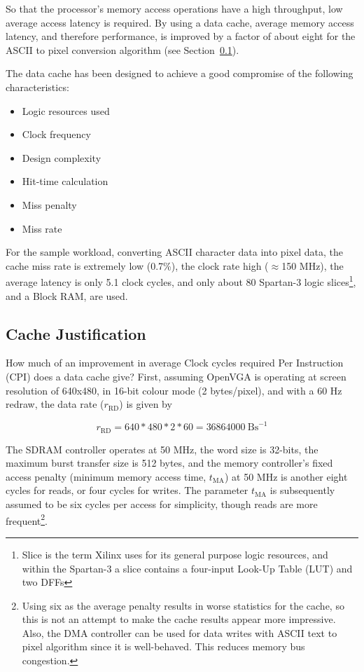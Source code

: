 So that the processor's memory access operations have a high throughput, low
average access latency is required. By using a data cache, average memory access
latency, and therefore performance, is improved by a factor of about eight for
the ASCII to pixel conversion algorithm (see Section~\ref{CACHE_Justification}).

The data cache has been designed to achieve a good compromise of the following
characteristics:
\begin{itemize}
  \item Logic resources used
  \item Clock frequency
  \item Design complexity
  \item Hit-time calculation
  \item Miss penalty
  \item Miss rate
\end{itemize}

For the sample workload, converting ASCII character data into pixel data, the
cache miss rate is extremely low (0.7\%), the clock rate high ($\approx$150
MHz), the average latency is only 5.1 clock cycles, and only about 80 Spartan-3
logic slices\footnote{Slice is the term Xilinx uses for its general purpose logic
resources, and within the Spartan-3 a slice contains a four-input Look-Up
Table (LUT) and two DFFs}, and
a Block RAM, are used.


\subsection{Cache Justification}
\label{CACHE_Justification}
How much of an improvement in average Clock cycles required Per
Instruction (CPI) does
a data cache give? First, assuming OpenVGA is operating at screen resolution of
640x480, in 16-bit colour mode (2 bytes/pixel), and with a 60 Hz redraw, the data
rate ($r_\mathrm{RD}$) is given by

\[
r_\mathrm{RD} = 640 * 480 * 2 * 60 = 36864000~\mathrm{Bs}^{-1}
\]

The SDRAM controller operates at 50 MHz, the word size is 32-bits, the maximum
burst transfer size is 512 bytes, and the memory controller's fixed access
penalty (minimum memory access time, $t_\mathrm{MA}$) at 50 MHz is another eight
cycles for reads, or four cycles for writes. The parameter $t_\mathrm{MA}$ is
subsequently assumed to be six cycles per access for simplicity, though reads are
more frequent\footnote{Using six as the average penalty results in worse
statistics for the cache, so this is not an attempt to make the cache results
appear more impressive. Also, the DMA controller can be used for data writes with
ASCII text to pixel algorithm since it is well-behaved. This reduces memory bus
congestion.}.

